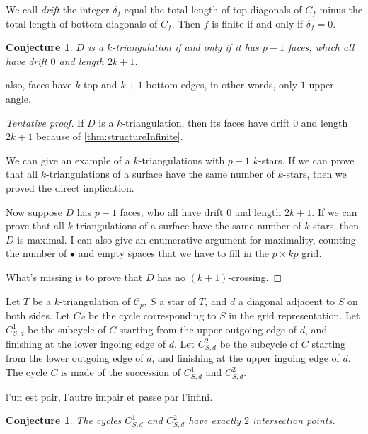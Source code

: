 \documentclass{amsart}
\newtheorem{conjecture}[theorem]{Conjecture}
\theoremstyle{remark}
\newcommand{\cylinder}{\mathcal{C}}
\begin{document}
We call \emph{drift} the integer $\delta_f$ equal the total length of top diagonals of $C_f$ minus the total length of bottom diagonals of $C_f$.
Then $f$ is finite if and only if $\delta_f=0$.

\begin{conjecture}
$D$ is a $k$-triangulation if and only if it has $p-1$ faces, which all have drift $0$ and length $2k+1$.
\end{conjecture}


also, faces have $k$ top and $k+1$ bottom edges, in other words, only $1$ upper angle.

\begin{proof}[Tentative proof]
If $D$ is a $k$-triangulation, then its faces have drift $0$ and length $2k+1$ because of \cref{thm:structureInfinite}.

We can give an example of a $k$-triangulations with $p-1$ $k$-stars. If we can prove that all $k$-triangulations of a surface have the same number of $k$-stars, then we proved the direct implication.

Now suppose $D$ has $p-1$ faces, who all have drift $0$ and length $2k+1$. 
If we can prove that all $k$-triangulations of a surface have the same number of $k$-stars, then $D$ is maximal. I can also give an enumerative argument for maximality, counting the number of $\bullet$ and empty spaces that we have to fill in the $p\times kp$ grid.

What's missing is to prove that $D$ has no $(k+1)$-crossing.
\end{proof}


Let $T$ be a $k$-triangulation of $\cylinder_p$, $S$ a star of $T$, and $d$ a diagonal adjacent to $S$ on both sides.
Let $C_S$ be the cycle corresponding to $S$ in the grid representation.
Let $C_{S,d}^1$ be the subcycle of $C$ starting from the upper outgoing edge of $d$, and finishing at the lower ingoing edge of $d$.
Let $C_{S,d}^2$ be the subcycle of $C$ starting from the lower outgoing edge of $d$, and finishing at the upper ingoing edge of $d$.
The cycle $C$ is made of the succession of $C_{S,d}^1$ and $C_{S,d}^2$.

l'un est pair, l'autre impair et passe par l'infini. 

\begin{conjecture}
The cycles $C_{S,d}^1$ and $C_{S,d}^2$ have exactly $2$ intersection points.
\end{conjecture}
\end{document}
